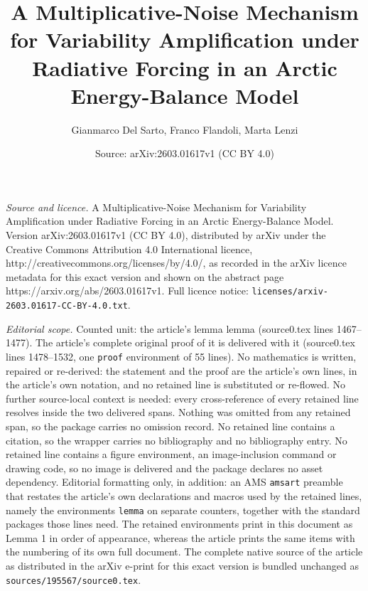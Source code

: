 \documentclass[10pt,a4paper]{amsart}
\title{A Multiplicative-Noise Mechanism for Variability Amplification under Radiative Forcing in an Arctic Energy-Balance Model}
\author{Gianmarco Del Sarto, Franco Flandoli, Marta Lenzi}
\date{Source: arXiv:2603.01617v1 (CC BY 4.0)}
\begin{document}
\maketitle

\noindent\emph{Source and licence.} A Multiplicative-Noise Mechanism for Variability Amplification under Radiative Forcing in an Arctic Energy-Balance Model. Version arXiv:2603.01617v1 (CC BY 4.0), distributed by arXiv under the Creative Commons Attribution 4.0 International licence, http://creativecommons.org/licenses/by/4.0/, as recorded in the arXiv licence metadata for this exact version and shown on the abstract page https://arxiv.org/abs/2603.01617v1. Full licence notice: \texttt{licenses/arxiv-2603.01617-CC-BY-4.0.txt}.\par\smallskip

\noindent\textit{Editorial scope.} Counted unit: the article's lemma lemma (source0.tex lines 1467--1477). The article's complete original proof of it is delivered with it (source0.tex lines 1478--1532, one \texttt{proof} environment of 55 lines). No mathematics is written, repaired or re-derived: the statement and the proof are the article's own lines, in the article's own notation, and no retained line is substituted or re-flowed.  No further source-local context is needed: every cross-reference of every retained line resolves inside the two delivered spans.  Nothing was omitted from any retained span, so the package carries no omission record.  No retained line contains a citation, so the wrapper carries no bibliography and no bibliography entry.  No retained line contains a figure environment, an image-inclusion command or drawing code, so no image is delivered and the package declares no asset dependency.  Editorial formatting only, in addition: an AMS \texttt{amsart} preamble that restates the article's own declarations and macros used by the retained lines, namely the environments \texttt{lemma} on separate counters, together with the standard packages those lines need.  The retained environments print in this document as Lemma 1 in order of appearance, whereas the article prints the same items with the numbering of its own full document.  The complete native source of the article as distributed in the arXiv e-print for this exact version is bundled unchanged as \texttt{sources/195567/source0.tex}.
\end{document}
